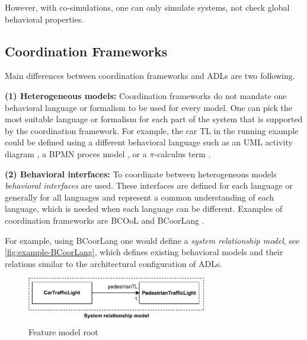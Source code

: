 \documentclass[runningheads]{llncs}
\begin{document}
However, with co-simulations, one can only simulate systems, not check global behavioral properties.

\subsection{Coordination Frameworks} \label{subsec:frameworks}

Main differences between coordination frameworks and ADLs are two following.

\textbf{(1) Heterogeneous models:} Coordination frameworks do not mandate one behavioral language or formalism to be used for every model.
One can pick the most suitable language or formalism for each part of the system that is supported by the coordination framework.
For example, the car TL in the running example could be defined using a different behavioral language such as an UML activity diagram \cite{objectmanagementgroupUnifiedModelingLanguage2017}, a BPMN proces model \cite{objectmanagementgroupBusinessProcessModel2013}, or a $\pi$-calculus term \cite{milnerCommunicatingMobileSystems2010}.

\textbf{(2) Behavioral interfaces:} To coordinate between heterogeneous models \textit{behavioral interfaces} are used.
These interfaces are defined for each language or generally for all languages and represent a common understanding of each language, which is needed when each language can be different.
Examples of coordination frameworks are BCOoL \cite{varalarsenBCOolBehavioralCoordination2016,varalarsenBehavioralCoordinationOperator2015} and BCoorLang \cite{krauterBehavioralConsistencyMultimodeling2023}.

For example, using BCoorLang one would define a \textit{system relationship model}, see \autoref{fig:example-BCoorLang}, which defines existing behavioral models and their relations similar to the architectural configuration of ADLs.

\begin{figure}[ht]
	\centering
	\includegraphics[width=0.7\textwidth]{images/running_example_BCorrLang}
	\caption{Feature model root}
	\label{fig:example-BCoorLang}
\end{figure}
\end{document}
